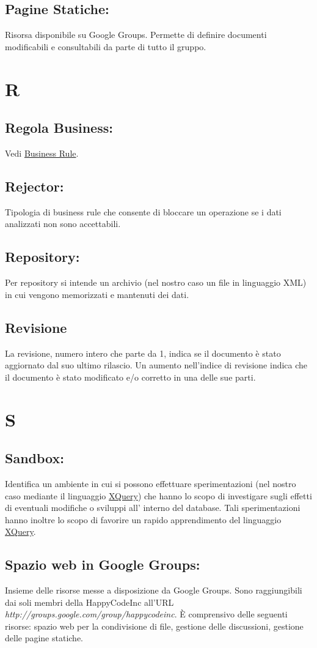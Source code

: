 \section{Pagine Statiche:}
Risorsa disponibile su Google Groups. Permette di definire documenti modificabili e consultabili da parte di tutto il gruppo.

\chapter{R}
\section{Regola Business:}
Vedi \hyperlink{Business Rule}{Business Rule}.
\section{Rejector:}
Tipologia di business rule che consente di bloccare un operazione se i dati analizzati non sono accettabili.
\section{Repository:} 
Per repository si intende un archivio (nel nostro caso un file in linguaggio XML) in cui vengono memorizzati e mantenuti dei dati.
\section{Revisione}
La revisione, numero intero che parte da 1, indica se il documento \`e stato aggiornato dal suo ultimo rilascio. Un aumento nell'indice di revisione indica che il documento \`e stato modificato e/o corretto in una delle sue parti.

\chapter{S}
\section{Sandbox:}
Identifica un ambiente in cui si possono effettuare sperimentazioni (nel nostro caso mediante il linguaggio \hyperlink{XQuery}{XQuery}) che hanno lo scopo di investigare sugli effetti di eventuali modifiche o sviluppi all' interno del database. Tali sperimentazioni hanno inoltre lo scopo di favorire un rapido apprendimento del linguaggio \hyperlink{XQuery}{XQuery}.
\hypertarget{Spazio web in Google Groups}{}
\section{Spazio web in Google Groups:}
Insieme delle risorse messe a disposizione da Google Groups. Sono raggiungibili dai soli membri della HappyCodeInc all'URL\\ \textit{http://groups.google.com/group/happycodeinc}. \`E comprensivo delle seguenti risorse: spazio web per la condivisione di file, gestione delle discussioni, gestione delle pagine statiche.
